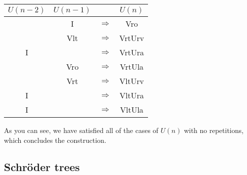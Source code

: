 \documentclass[final]{article}
\theoremstyle{definition}
\theoremstyle{remark}
\begin{document}
\begin{center}
    \begin{longtable}{| c | c | c | c |}
        \hline

        \(U(n-2)\) &
        \(U(n-1)\) &
               &
        \(U(n)\)\\
        \hline

        &
        I  &
        \(\Rightarrow\)&
        Vro  \\
        \hline

        &
        Vlt  &
        \(\Rightarrow\)&
        VrtUrv  \\
        \hline

        I  &
        &
        \(\Rightarrow\)&
        VrtUra  \\
        \hline

        &
        Vro  &
        \(\Rightarrow\)&
        VrtUla  \\
        \hline

        &
        Vrt  &
        \(\Rightarrow\)&
        VltUrv  \\
        \hline

        I  &
        &
        \(\Rightarrow\)&
        VltUra  \\
        \hline

        I  &
        &
        \(\Rightarrow\)&
        VltUla  \\
        \hline
    \end{longtable}
\end{center}


As you can see, we have satisfied all of the cases of \(U(n)\) with no repetitions, which concludes the construction.

\subsection{Schröder trees}%
\label{sub:schröder_trees}
\end{document}
